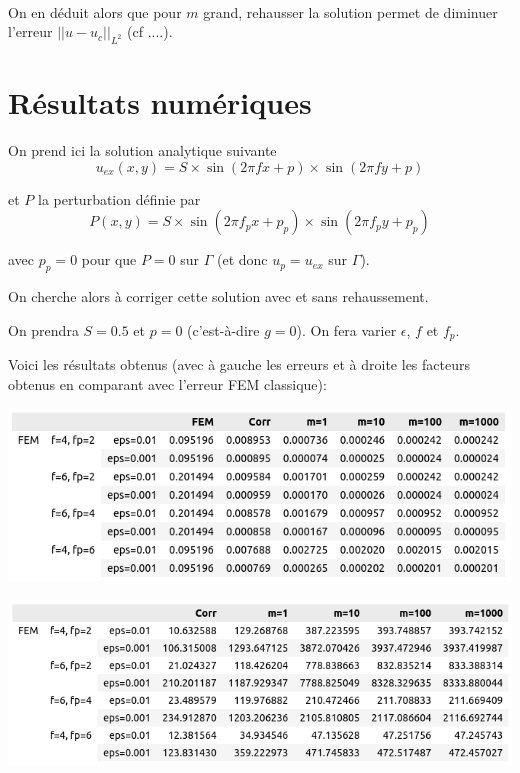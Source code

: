 \documentclass[french]{article}
\begin{document}
	 \; \\
	
	On en déduit alors que pour $m$ grand, rehausser la solution permet de diminuer l'erreur $||u-u_{c}||_{L^2}$ (cf ....).
	
	\section*{Résultats numériques}
	
	On prend ici la solution analytique suivante
	$$u_{ex}(x,y) = S\times\sin(2\pi fx + p)\times\sin(2\pi fy + p)$$ 
	
	et $P$ la perturbation définie par
	$$P(x,y)=S\times\sin(2\pi f_px + p_p)\times\sin(2\pi f_py + p_p)$$
	
	avec $p_p=0$ pour que $P=0$ sur $\Gamma$ (et donc $u_p=u_{ex}$ sur $\Gamma$). 
	
	On cherche alors à corriger cette solution avec et sans rehaussement.
	
	On prendra $S=0.5$ et $p=0$ (c'est-à-dire $g=0$). On fera varier $\epsilon$, $f$ et $f_p$. 
	
	Voici les résultats obtenus (avec à gauche les erreurs et à droite les facteurs obtenus en comparant avec l'erreur FEM classique):
	
	\begin{minipage}{0.48\linewidth}
		\centering
		\includegraphics[width=\linewidth]{erreur.png}
	\end{minipage}
	\begin{minipage}{0.48\linewidth}
		\centering
		\includegraphics[width=\linewidth]{facteur.png}
	\end{minipage}
	
\end{document}
